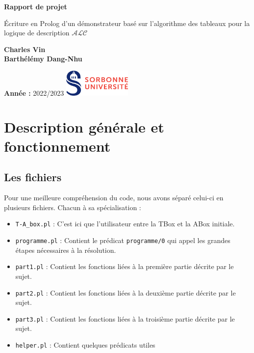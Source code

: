 \documentclass{article}
\begin{document}
\begin{titlepage}
    \begin{center}
        \vspace*{1cm}

        \Huge
        \textbf{Rapport de projet}

        \vspace{0.5cm}
        \LARGE
        Écriture en Prolog d'un démonstrateur basé sur l'algorithme des tableaux pour la logique de description  $ \mathcal{ALC}$

        \vspace{1.5cm}

        \textbf{Charles Vin}\\
        \textbf{Barthélémy Dang-Nhu}

        \vfill



        \normalsize

        \textbf{Année :}
        2022/2023
        \hfill
        \includegraphics[width=0.25\textwidth]{./src/logo.png}
    \end{center}
\end{titlepage}

\tableofcontents
\newpage

\section{Description générale et fonctionnement}
\subsection{Les fichiers}
Pour une meilleure compréhension du code, nous avons séparé celui-ci en plusieurs fichiers. Chacun à sa spécialisation : \begin{itemize}
    \item \verb|T-A_box.pl| : C'est ici que l'utilisateur entre la TBox et la ABox initiale.
    \item \verb|programme.pl| : Contient le prédicat \verb|programme/0|  qui appel les grandes étapes nécessaires à la résolution.
    \item \verb|part1.pl| : Contient les fonctions liées à la première partie décrite par le sujet.
    \item \verb|part2.pl| : Contient les fonctions liées à la deuxième partie décrite par le sujet.
    \item \verb|part3.pl| : Contient les fonctions liées à la troisième partie décrite par le sujet.
    \item \verb|helper.pl| : Contient quelques prédicats utiles
\end{itemize}
\end{document}
